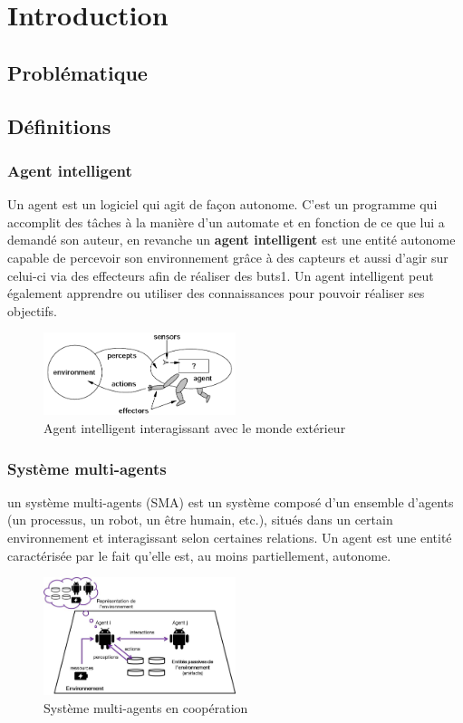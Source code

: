 \setcounter{chapter}{0}
\chapter{Introduction}
\section{Problématique}
\section{Définitions}
\subsection{Agent intelligent}
Un agent est un logiciel qui agit de façon autonome. C'est un programme qui accomplit des tâches à la manière d'un automate et en fonction de ce que lui a demandé son auteur, en revanche un \textbf{agent intelligent} est une entité autonome capable de percevoir son environnement grâce à des capteurs et aussi d'agir sur celui-ci via des effecteurs afin de réaliser des buts1. Un agent intelligent peut également apprendre ou utiliser des connaissances pour pouvoir réaliser ses objectifs.
\begin{figure}[H]
	\centering
	\includegraphics[width=0.5\textwidth]{imgs/intelligentAgent.png}
	\caption{Agent intelligent interagissant avec le monde extérieur }
\end{figure}
\newpage
\subsection{Système multi-agents}
un système multi-agents (SMA) est un système composé d'un ensemble d'agents (un processus, un robot, un être humain, etc.), situés dans un certain environnement et interagissant selon certaines relations. Un agent est une entité caractérisée par le fait qu'elle est, au moins partiellement, autonome.
\begin{figure}[H]
	\centering
	\includegraphics[width=0.5\textwidth]{imgs/SMA.jpg}
	\caption{Système multi-agents en coopération}
\end{figure}